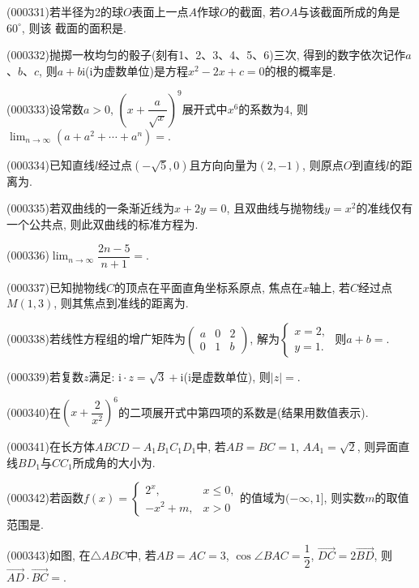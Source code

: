 \item (000331)若半径为2的球$O$表面上一点$A$作球$O$的截面, 若$OA$与该截面所成的角是$60^\circ$, 则该
截面的面积是.
\item (000332)抛掷一枚均匀的骰子(刻有1、2、3、4、5、6)三次, 得到的数字依次记作$a$、$b$、$c$, 则$a+b\mathrm{i}$($\mathrm{i}$为虚数单位)是方程$x^2-2x+c=0$的根的概率是.
\item (000333)设常数$a>0$, $(x+\dfrac{a}{\sqrt{x}})^9$展开式中$x^6$的系数为$4$, 则$\displaystyle\lim_{n\to \infty}(a+a^2+\cdots+a^n)=$.
\item (000334)已知直线$l$经过点$(-\sqrt{5},0)$且方向向量为$(2,-1)$, 则原点$O$到直线$l$的距离为.
\item (000335)若双曲线的一条渐近线为$x+2y=0$, 且双曲线与抛物线$y=x^2$的准线仅有一个公共点, 则此双曲线的标准方程为.
\item (000336)$\displaystyle\lim_{n\to \infty}\dfrac{2n-5}{n+1}=$.
\item (000337)已知抛物线$C$的顶点在平面直角坐标系原点, 焦点在$x$轴上, 若$C$经过点$M(1,3)$, 则其焦点到准线的距离为.
\item (000338)若线性方程组的增广矩阵为$\begin{pmatrix}    a & 0 & 2 \\ 0 & 1 & b\end{pmatrix}$, 解为$\begin{cases}    x=2, \\ y=1.\end{cases}$ 则$a+b=$.
\item (000339)若复数$z$满足: $\mathrm{i}\cdot z=\sqrt{3}+\mathrm{i}$($\mathrm{i}$是虚数单位), 则$|z|=$.
\item (000340)在$(x+\dfrac{2}{x^2})^6$的二项展开式中第四项的系数是(结果用数值表示).
\item (000341)在长方体$ABCD-A_1B_1C_1D_1$中, 若$AB=BC=1$, $AA_1=\sqrt{2}$, 则异面直线$BD_1$与$CC_1$所成角的大小为.
\item (000342)若函数$f(x)=\begin{cases}    2^x, & x\le 0, \\ -x^2+m, & x>0 \end{cases}$的值域为$(-\infty ,1]$, 则实数$m$的取值范围是.
\item (000343)如图, 在$\triangle ABC$中, 若$AB=AC=3$, $\cos \angle BAC=\dfrac{1}{2}$, $\overrightarrow{DC}=2\overrightarrow{BD}$, 则$\overrightarrow{AD}\cdot \overrightarrow{BC}=$.
\begin{center}
\end{center}
